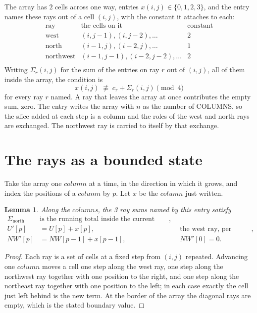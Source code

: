\documentclass[11pt,a4paper]{article}
\theoremstyle{plain}
\newtheorem{lemma}[theorem]{Lemma}
\theoremstyle{definition}
\begin{document}
The array has $2$ cells across one way, entries $x(i,j)\in\{0,1,2,3\}$, and the entry names these
rays out of a cell $(i,j)$, with the constant it attaches to each:
\[
\begin{array}{lll}
\text{ray} & \text{the cells on it} & \text{constant} \\[2pt]
\text{west} & (i,j-1),(i,j-2),\dots & 2 \\
\text{north} & (i-1,j),(i-2,j),\dots & 1 \\
\text{northwest} & (i-1,j-1),(i-2,j-2),\dots & 2 \\
\end{array}
\]
Writing $\Sigma_r(i,j)$ for the sum of the entries on ray $r$ out of $(i,j)$, all of them
inside the array, the condition is
\[
x(i,j)\;\not\equiv\;c_r+\Sigma_r(i,j) \pmod{4}
\]
for every ray $r$ named. A ray that leaves the array at once contributes the empty sum,
zero. The entry writes the array with $n$ as the number of COLUMNS, so the slice added at each step is a column and the roles of the west and north rays are exchanged. The northwest ray is carried to itself by that exchange.

\section{The rays as a bounded state}

Take the array one $column$ at a time, in the direction in which it grows, and index the
positions of a $column $ by $p$. Let $x$ be the $column$ just written.

\begin{lemma}\label{lem:rays}
Along the $column$s, the 3 ray sums named by this entry satisfy
\[
\begin{aligned}
\Sigma_{\mathrm{north}}\ &\text{is the running total inside the current column},\\
U'[p]&=U[p]+x[p], &&\text{the west ray, per position},\\
NW'[p]&=NW[p-1]+x[p-1], && NW'[0]=0 .
\end{aligned}
\]
\end{lemma}

\begin{proof}
Each ray is a set of cells at a fixed step from $(i,j)$ repeated. Advancing one $column$
moves a cell one step along the west ray, one step along the northwest ray together with one
position to the right, and one step along the northeast ray together with one position to the
left; in each case exactly the cell just left behind is the new term. At the border of the
array the diagonal rays are empty, which is the stated boundary value.
\end{proof}
\end{document}
